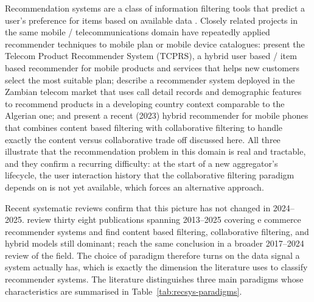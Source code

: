 Recommendation systems are a class of information filtering tools that predict a user's preference for items based on available data \parencite{Geron2022, Raza2024Survey}. Closely related projects in the same mobile / telecommunications domain have repeatedly applied recommender techniques to mobile plan or mobile device catalogues: \textcite{ZhangLiu2011TCPRS} present the Telecom Product Recommender System (TCPRS), a hybrid user based / item based recommender for mobile products and services that helps new customers select the most suitable plan; \textcite{SoftZulu2017Zambia} describe a recommender system deployed in the Zambian telecom market that uses call detail records and demographic features to recommend products in a developing country context comparable to the Algerian one; and \textcite{Chandrahaas2023Mobile} present a recent (2023) hybrid recommender for mobile phones that combines content based filtering with collaborative filtering to handle exactly the content versus collaborative trade off discussed here. All three illustrate that the recommendation problem in this domain is real and tractable, and they confirm a recurring difficulty: at the start of a new aggregator's lifecycle, the user interaction history that the collaborative filtering paradigm depends on is not yet available, which forces an alternative approach.

{\sloppy Recent systematic reviews confirm that this picture has not changed in 2024--2025. \textcite{PoniszewskaMaranda2025} review thirty eight publications spanning 2013--2025 covering e commerce recommender systems and find content based filtering, collaborative filtering, and hybrid models still dominant; \textcite{Raza2024Survey} reach the same conclusion in a broader 2017--2024 review of the field. The choice of paradigm therefore turns on the data signal a system actually has, which is exactly the dimension the literature uses to classify recommender systems. The literature distinguishes three main paradigms whose characteristics are summarised in Table~\ref{tab:recsys-paradigms}.\par}

